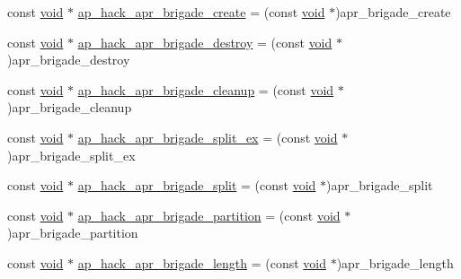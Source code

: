 \begin{DoxyCompactItemize}
\item 
const \hyperlink{group__MOD__ISAPI_gacd6cdbf73df3d9eed42fa493d9b621a6}{void} $\ast$ \hyperlink{srclib_2apr-util_2exports_8c_a4296ee5a2a9e77161ff3417b6abfd5b0}{ap\+\_\+hack\+\_\+apr\+\_\+brigade\+\_\+create} = (const \hyperlink{group__MOD__ISAPI_gacd6cdbf73df3d9eed42fa493d9b621a6}{void} $\ast$)apr\+\_\+brigade\+\_\+create
\item 
const \hyperlink{group__MOD__ISAPI_gacd6cdbf73df3d9eed42fa493d9b621a6}{void} $\ast$ \hyperlink{srclib_2apr-util_2exports_8c_afa3ba77b6e7d8f959022fafeb2f118a7}{ap\+\_\+hack\+\_\+apr\+\_\+brigade\+\_\+destroy} = (const \hyperlink{group__MOD__ISAPI_gacd6cdbf73df3d9eed42fa493d9b621a6}{void} $\ast$)apr\+\_\+brigade\+\_\+destroy
\item 
const \hyperlink{group__MOD__ISAPI_gacd6cdbf73df3d9eed42fa493d9b621a6}{void} $\ast$ \hyperlink{srclib_2apr-util_2exports_8c_a0bc8d4a26af94bab05ad9336d59a4a88}{ap\+\_\+hack\+\_\+apr\+\_\+brigade\+\_\+cleanup} = (const \hyperlink{group__MOD__ISAPI_gacd6cdbf73df3d9eed42fa493d9b621a6}{void} $\ast$)apr\+\_\+brigade\+\_\+cleanup
\item 
const \hyperlink{group__MOD__ISAPI_gacd6cdbf73df3d9eed42fa493d9b621a6}{void} $\ast$ \hyperlink{srclib_2apr-util_2exports_8c_aad77ad3c8736c318adbef560965a8341}{ap\+\_\+hack\+\_\+apr\+\_\+brigade\+\_\+split\+\_\+ex} = (const \hyperlink{group__MOD__ISAPI_gacd6cdbf73df3d9eed42fa493d9b621a6}{void} $\ast$)apr\+\_\+brigade\+\_\+split\+\_\+ex
\item 
const \hyperlink{group__MOD__ISAPI_gacd6cdbf73df3d9eed42fa493d9b621a6}{void} $\ast$ \hyperlink{srclib_2apr-util_2exports_8c_a3906382318ef2ea8aa9b7e16c4469869}{ap\+\_\+hack\+\_\+apr\+\_\+brigade\+\_\+split} = (const \hyperlink{group__MOD__ISAPI_gacd6cdbf73df3d9eed42fa493d9b621a6}{void} $\ast$)apr\+\_\+brigade\+\_\+split
\item 
const \hyperlink{group__MOD__ISAPI_gacd6cdbf73df3d9eed42fa493d9b621a6}{void} $\ast$ \hyperlink{srclib_2apr-util_2exports_8c_a1b5070ee4eed3f789ef9cff10e30c889}{ap\+\_\+hack\+\_\+apr\+\_\+brigade\+\_\+partition} = (const \hyperlink{group__MOD__ISAPI_gacd6cdbf73df3d9eed42fa493d9b621a6}{void} $\ast$)apr\+\_\+brigade\+\_\+partition
\item 
const \hyperlink{group__MOD__ISAPI_gacd6cdbf73df3d9eed42fa493d9b621a6}{void} $\ast$ \hyperlink{srclib_2apr-util_2exports_8c_a662e1e30cd26f1fa5b2d83adfdbf1172}{ap\+\_\+hack\+\_\+apr\+\_\+brigade\+\_\+length} = (const \hyperlink{group__MOD__ISAPI_gacd6cdbf73df3d9eed42fa493d9b621a6}{void} $\ast$)apr\+\_\+brigade\+\_\+length

\end{DoxyCompactItemize}
